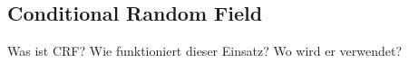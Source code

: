 
\subsection{Conditional Random Field}
Was ist CRF? Wie funktioniert dieser Einsatz? Wo wird er verwendet?



